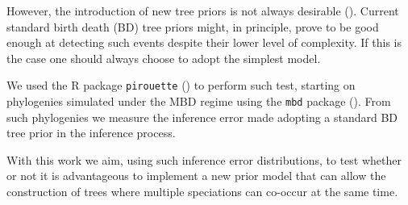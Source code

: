 However, the introduction of new tree priors is not always desirable (\citep{bilderbeek2019pirouette}). Current standard birth death (BD) tree priors might, in principle, prove to be good enough at detecting such events despite their lower level of complexity.
If this is the case one should always choose to adopt the simplest model.

We used the R package \verb;pirouette; (\citep{pirouette}) to perform such test, starting on phylogenies simulated under the MBD regime using the \verb;mbd; package (\citep{mbd}).
From such phylogenies we measure the inference error made adopting a standard BD tree prior in the inference process.

With this work we aim, using such inference error distributions, to test whether or not it is advantageous to implement a new prior model that can allow the construction of trees where multiple speciations can co-occur at the same time.